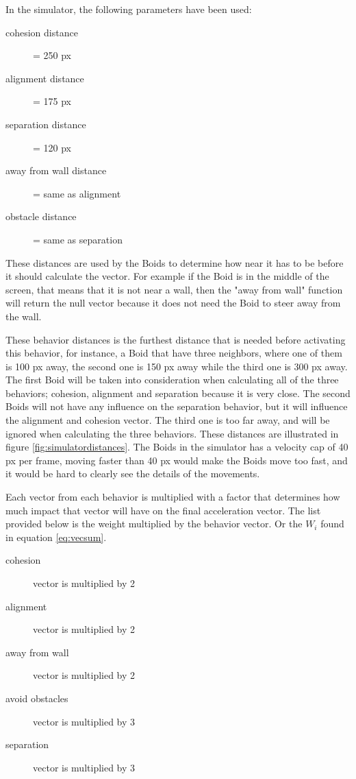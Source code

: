 
In the simulator, the following parameters have been used:
\begin{description}
\item[cohesion distance] = 250 px
\item[alignment distance] = 175 px
\item[separation distance] = 120 px
\item[away from wall distance] = same as alignment
\item[obstacle distance] = same as separation
\end{description}
These distances are used by the Boids to determine how near it has to be before it should calculate the vector. For example if the Boid is in the middle of the screen, that means that it is not near a wall, then the "away from wall" function will return the null vector because it does not need the Boid to steer away from the wall.


These behavior distances is the furthest distance that is needed before activating this behavior, for instance, a Boid that have three neighbors, where one of them is 100 px away, the second one is 150 px away while the third one is 300 px away. The first Boid will be taken into consideration when calculating all of the three behaviors; cohesion, alignment and separation because it is very close. The second Boids will not have any influence on the separation behavior, but it will influence the alignment and cohesion vector. The third one is too far away, and will be ignored when calculating the three behaviors. These distances are illustrated in figure \ref{fig:simulatordistances}.
The Boids in the simulator has a velocity cap of 40 px per frame, moving faster than 40 px would make the Boids move too fast, and it would be hard to clearly see the details of the movements. 

Each vector from each behavior is multiplied with a factor that determines how much impact that vector will have on the final acceleration vector.
The list provided below is the weight multiplied by the behavior vector. Or the $W_i$ found in equation \ref{eq:vecsum}.

\begin{description}
\item[cohesion] vector is multiplied by 2
\item[alignment] vector is multiplied by 2
\item[away from wall] vector is multiplied by 2
\item[avoid obstacles] vector is multiplied by 3
\item[separation] vector is multiplied by 3
\end{description}

